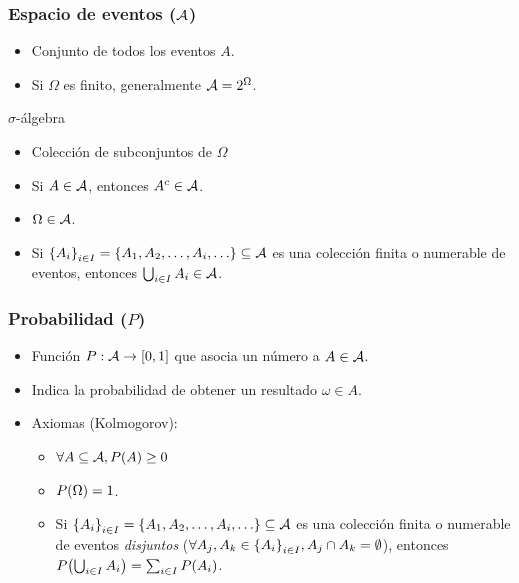 \documentclass[table]{beamer}
\begin{document}
\begin{frame}
    \frametitle{Espacio de eventos ($\mathcal{A}$)}
        \begin{itemize}
            \item Conjunto de todos los eventos $A$.
            \item Si $\Omega$ es finito, generalmente $\mathcal{A} = 2^{\Omega}$.
        \end{itemize}
   \begin{block}{$\sigma$-álgebra}
        \begin{itemize}
				\item Colección de subconjuntos de $\Omega$
            \item Si $A \in \mathcal{A}$, entonces $A^{c} \in \mathcal{A}$.
            \item $\Omega \in \mathcal{A}$.
            \item Si $\bparens{A_{i}}_{i \in I} = \bparens{A_{1}, A_{2}, \ldots, A_{i}, \ldots} \subseteq \eventspace$ es una colección finita o numerable de eventos, entonces $\bigcup_{i \in I} A_{i} \in \mathcal{A}$.
        \end{itemize}
    \end{block}
\end{frame}

\begin{frame}
    \frametitle{Probabilidad ($P$)}
       \begin{itemize}
            \item Función $P: \eventspace \rightarrow \sparens{0, 1}$ que asocia un número a $A \in \mathcal{A}$.
            \item Indica la probabilidad de obtener un resultado $\omega \in A$.
            \item Axiomas (Kolmogorov):
                \begin{itemize}
                    \item $\forall A \subseteq \eventspace, \prob{A} \geq 0$
                    \item $\prob{\Omega} = 1$.
                    \item Si $\bparens{A_{i}}_{i \in I} = \bparens{A_{1}, A_{2}, \ldots, A_{i}, \ldots} \subseteq \eventspace$ es una colección finita o numerable de eventos \emph{disjuntos} ($\forall A_{j}, A_{k} \in \bparens{A_{i}}_{i \in I}, A_{j} \cap A_{k} = \emptyset$), entonces $\prob{\bigcup_{i \in I} A_{i}} = \sum_{i \in I} \prob{A_{i}}$.
                \end{itemize}
        \end{itemize}

\end{frame}
\end{document}
